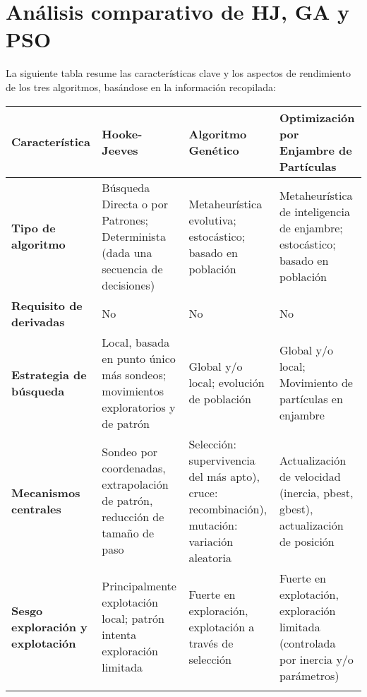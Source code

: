 \newpage

\section{Análisis comparativo de HJ, GA y PSO}

La siguiente tabla resume las características clave y los aspectos de rendimiento de los tres algoritmos, basándose en la información recopilada:\renewcommand{\arraystretch}{1.5}
\begin{table}[h!]
    \centering
    \setlength{\arrayrulewidth}{1.25pt}
    \begin{tabularx}{\textwidth}{X|X|X|X}
        \rowcolor{cw0!80}
        \textbf{\color{white}Característica} & \textbf{\color{white}Hooke-Jeeves} & \textbf{\color{white}Algoritmo Genético} & \textbf{\color{white}Optimización por Enjambre de Partículas} \\
        \hline
        \rowcolor{cw2!70!white}
        \textbf{Tipo de algoritmo} & Búsqueda Directa o por Patrones; Determinista (dada una secuencia de decisiones) & Metaheurística evolutiva; estocástico; basado en población & Metaheurística de inteligencia de enjambre; estocástico; basado en población \\
        \hline
        \rowcolor{cw1!30!white}
        \textbf{Requisito de derivadas} & No & No & No \\
        \hline
        \rowcolor{cw2!70!white}
        \textbf{Estrategia de búsqueda} & Local, basada en punto único más sondeos; movimientos exploratorios y de patrón & Global y/o local; evolución de población & Global y/o local; Movimiento de partículas en enjambre \\
        \hline
        \rowcolor{cw1!30!white}
        \textbf{Mecanismos centrales} & Sondeo por coordenadas, extrapolación de patrón, reducción de tamaño de paso & Selección: supervivencia del más apto), cruce: recombinación), mutación: variación aleatoria & Actualización de velocidad (inercia, pbest, gbest), actualización de posición \\
        \hline
        \rowcolor{cw2!70!white}
        \textbf{Sesgo exploración y explotación} & Principalmente explotación local; patrón intenta exploración limitada & Fuerte en exploración, explotación a través de selección & Fuerte en explotación, exploración limitada (controlada por inercia y/o parámetros) \\
        \hline
        \rowcolor{cw1!30!white}

\end{tabularx}
\end{table}
